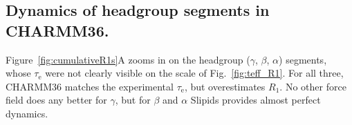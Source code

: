 \documentclass[journal=jpcbfk,manuscript=article,layout=twocolumn]{achemso}
\begin{document}

\subsection*{Dynamics of headgroup segments in CHARMM36.}

Figure~\ref{fig:cumulativeR1s}A zooms in on the headgroup ($\gamma$, $\beta$, $\alpha$) segments,
whose $\tau_\mathrm e$ were not clearly visible on the scale of Fig.~\ref{fig:teff_R1}.
%
For all three, CHARMM36 matches the experimental $\tau_\mathrm e$,
but overestimates $R_1$.
%
No other force field does any better for $\gamma$, but
for $\beta$ and $\alpha$ Slipids provides almost perfect dynamics.
\end{document}
